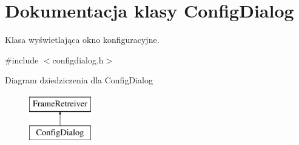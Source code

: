 \hypertarget{class_config_dialog}{
\section{Dokumentacja klasy ConfigDialog}
\label{class_config_dialog}
}


Klasa wyświetlająca okno konfiguracyjne.  




{\ttfamily \#include $<$configdialog.h$>$}

Diagram dziedziczenia dla ConfigDialog\begin{figure}[H]
\begin{center}
\leavevmode
\includegraphics[height=2cm]{class_config_dialog}
\end{center}
\end{figure}
